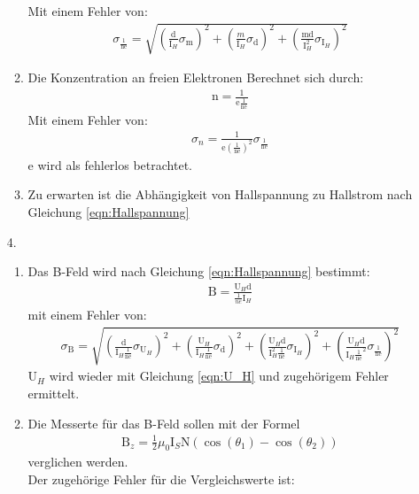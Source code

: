 \documentclass[12pt]{scrartcl}
\begin{document}
\begin{enumerate}
\begin{enumerate}
Mit einem Fehler von:
\begin{align}
\sigma_{\frac{1}{\text{ne}}} = 
\sqrt{\left(\frac{\text{d}}
{\text{I}_H}\sigma_{\text{m}}\right)^2+
\left(\frac{m}
{\text{I}_H}\sigma_{\text{d}}\right)^2+
\left(\frac{\text{m} \text{d}}
{\text{I}_H^2}\sigma_{\text{I}_H}\right)^2}
\label{eqn:Hallspannung_Fehler}
\end{align}
\item
Die Konzentration an freien Elektronen Berechnet sich durch:
\begin{align}
\text{n} = \frac{1}{\text{e}\frac{1}{\text{ne}}}
\label{eqn:freie_elektronen}
\end{align}
Mit einem Fehler von:
\begin{align}
\sigma_n = \frac{1}{\text{e}\left(\frac{1}{\text{ne}}\right)^2}\sigma_{\frac{1}{\text{ne}}}
\label{eqn:freie_elektronen_sigma}
\end{align}
e wird als fehlerlos betrachtet.
\item
Zu erwarten ist die Abhängigkeit von Hallspannung zu Hallstrom nach Gleichung \ref{eqn:Hallspannung}
\end{enumerate}
\item[4.]
\begin{enumerate}
\item
Das B-Feld wird nach Gleichung \ref{eqn:Hallspannung} bestimmt:
\begin{align*}
 \text{B}= \frac{\text{U}_H \text{d}}{\frac{1}{ne} \text{I}_H}
\end{align*}
mit einem Fehler von:
\begin{align}
\sigma_{\text{B}} = 
\sqrt{\left(\frac{\text{d}}
{\text{I}_H \frac{1}{\text{ne}}}\sigma_{\text{U}_H}\right)^2+
\left(\frac{\text{U}_H}
{\text{I}_H \frac{1}{\text{ne}}}\sigma_{\text{d}}\right)^2+
\left(\frac{\text{U}_H \text{d}}
{\text{I}_H^2 \frac{1}{\text{ne}}}\sigma_{\text{I}_H}\right)^2+
\left(\frac{\text{U}_H \text{d}}
{\text{I}_H \frac{1}{\text{ne}}^2}\sigma_{\frac{1}{\text{ne}}}\right)^2}
\end{align}
U$_H$ wird wieder mit Gleichung \ref{eqn:U_H}
und zugehörigem Fehler ermittelt.
\item
Die Messerte für das B-Feld sollen mit der Formel
\begin{align}
\text{B}_z = \frac{1}{2} \mu_0 \text{I}_S \text{N} (\cos(\theta_1) - \cos(\theta_2))
\label{eqn:Aufgabe 3_TD_B-Feld_1} 
\end{align}
verglichen werden.\\
Der zugehörige Fehler für die Vergleichswerte ist:

\end{enumerate}
\end{enumerate}
\end{document}
